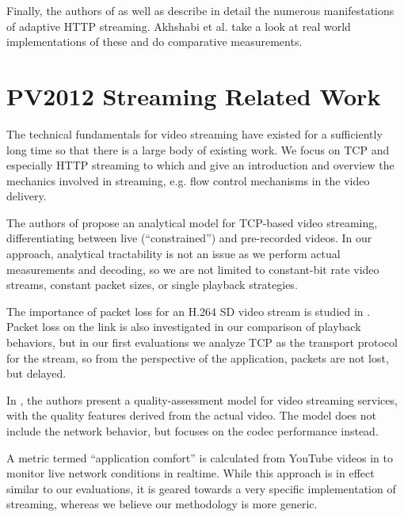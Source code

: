 Finally, the authors of \cite{ma2011mobile} as well as \cite{watching-video1} describe in detail the numerous manifestations of adaptive HTTP streaming. Akhshabi et al. \cite{akhshabi2011experimental} take a look at real world implementations of these and do comparative measurements.



\section{PV2012 Streaming Related Work}


The technical fundamentals for video streaming have existed for a sufficiently long time so that there is a large body of existing work. We focus on TCP and especially HTTP streaming to which \cite{watching-video1} and \cite{ma2011mobile} give an introduction and overview the mechanics involved in streaming, e.g. flow control mechanisms in the video delivery.


The authors of \cite{wang2003model} propose an analytical model for TCP-based video streaming, differentiating between live (``constrained'') and pre-recorded videos. In our approach, analytical tractability is not an issue as we perform actual measurements and decoding, so we are not limited to constant-bit rate video streams, constant packet sizes, or single playback strategies.

The importance of packet loss for an H.264 SD video stream is studied in \cite{pv2010loss}. Packet loss on the link is also investigated in our comparison of playback behaviors, but in our first evaluations we analyze TCP as the transport protocol for the stream, so from the perspective of the application, packets are not lost, but delayed.


In \cite{pv2010qoe}, the authors present a quality-assessment model for video streaming services, with the quality features derived from the actual video. The model does not include the network behavior, but focuses on the codec performance instead. 

A metric termed ``application comfort'' is calculated from YouTube videos in \cite{staehle2010yomo} to monitor live network conditions in realtime. While this approach is in effect similar to our evaluations, it is geared towards a very specific implementation of streaming, whereas we believe our methodology is more generic.



